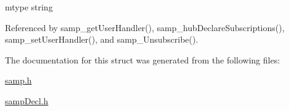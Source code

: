 mtype string 

Referenced by samp\_\-getUserHandler(), samp\_\-hubDeclareSubscriptions(), samp\_\-setUserHandler(), and samp\_\-Unsubscribe().

The documentation for this struct was generated from the following files:\begin{CompactItemize}
\item 
\hyperlink{samp_8h}{samp.h}\item 
\hyperlink{sampDecl_8h}{sampDecl.h}\end{CompactItemize}

